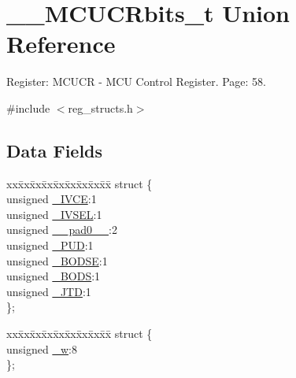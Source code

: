 \hypertarget{union_____m_c_u_c_rbits__t}{\section{\+\_\+\+\_\+\+M\+C\+U\+C\+Rbits\+\_\+t Union Reference}
\label{union_____m_c_u_c_rbits__t}
}


Register\+: M\+C\+U\+C\+R -\/ M\+C\+U Control Register. Page\+: 58.  




{\ttfamily \#include $<$reg\+\_\+structs.\+h$>$}

\subsection*{Data Fields}
\begin{DoxyCompactItemize}
\item 
\begin{tabbing}
xx\=xx\=xx\=xx\=xx\=xx\=xx\=xx\=xx\=\kill
struct \{\\
\>unsigned \hyperlink{union_____m_c_u_c_rbits__t_af353179edf7c94bff0975a8e112d0b83}{\_IVCE}:1\\
\>unsigned \hyperlink{union_____m_c_u_c_rbits__t_a53246060aa2bbc0beeb32faf89fba540}{\_IVSEL}:1\\
\>unsigned \hyperlink{union_____m_c_u_c_rbits__t_adbd03c329f61dc158c08a3180d499b1b}{\_\_pad0\_\_}:2\\
\>unsigned \hyperlink{union_____m_c_u_c_rbits__t_a896644c4a7715868daa9c586dfa6febe}{\_PUD}:1\\
\>unsigned \hyperlink{union_____m_c_u_c_rbits__t_a9f388d48bbe156de9bfce2bf227faf4a}{\_BODSE}:1\\
\>unsigned \hyperlink{union_____m_c_u_c_rbits__t_a603ae63222bf031a4c5e385690944bae}{\_BODS}:1\\
\>unsigned \hyperlink{union_____m_c_u_c_rbits__t_a2020211e426b9ba4fedb7fcc93b54b70}{\_JTD}:1\\
\}; \\

\end{tabbing}\item 
\begin{tabbing}
xx\=xx\=xx\=xx\=xx\=xx\=xx\=xx\=xx\=\kill
struct \{\\
\>unsigned \hyperlink{union_____m_c_u_c_rbits__t_a316f8409489efa58c40da257fba7cd39}{\_w}:8\\
\}; \\

\end{tabbing}\end{DoxyCompactItemize}


